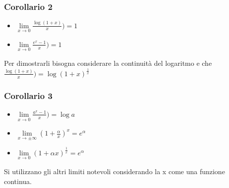 \subsubsection{Corollario 2}
\begin{itemize}
\item $\lim\limits_{x\rightarrow 0} \frac{\log (1+x)}{x})=1$
\item $\lim\limits_{x\rightarrow 0} \frac{e^x-1}{x})=1$
\end{itemize}
Per dimostrarli bisogna considerare la continuit\`a del logaritmo e che $\frac{\log (1+x)}{x})=\log (1+x)^{\frac{1}{x}}$
\subsubsection{Corollario 3}
\begin{itemize}
\item $\lim\limits_{x\rightarrow 0} \frac{a^x-1}{x})=\log a$
\item $\lim\limits_{x\rightarrow\pm\infty} (1+\frac{\alpha}{x})^x=e^\alpha$
\item $\lim\limits_{x\rightarrow 0} (1+\alpha x)^\frac{1}{x}=e^\alpha$
\end{itemize}
Si utilizzano gli altri limiti notevoli considerando la x come una funzione continua.